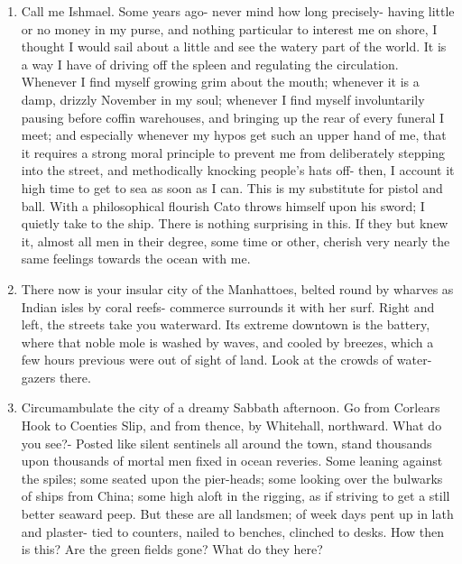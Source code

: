 \documentclass{../armymemo}
\begin{document}
\begin{enumerate}
	      \begin{enumerate}
		      \item Call me Ishmael. Some years ago- never mind how long precisely- having little or
		            no money in my purse, and nothing particular to interest me on shore, I thought
		            I would sail about a little and see the watery part of the world. It is a way I
		            have of driving off the spleen and regulating the circulation. Whenever I find
		            myself growing grim about the mouth; whenever it is a damp, drizzly November in
		            my soul; whenever I find myself involuntarily pausing before coffin warehouses,
		            and bringing up the rear of every funeral I meet; and especially whenever my
		            hypos get such an upper hand of me, that it requires a strong moral principle to
		            prevent me from deliberately stepping into the street, and methodically knocking
		            people's hats off- then, I account it high time to get to sea as soon as I can.
		            This is my substitute for pistol and ball. With a philosophical flourish Cato
		            throws himself upon his sword; I quietly take to the ship. There is nothing
		            surprising in this. If they but knew it, almost all men in their degree, some
		            time or other, cherish very nearly the same feelings towards the ocean with me.

		      \item There now is your insular city of the Manhattoes, belted round by wharves as
		            Indian isles by coral reefs- commerce surrounds it with her surf. Right and
		            left, the streets take you waterward. Its extreme downtown is the battery, where
		            that noble mole is washed by waves, and cooled by breezes, which a few hours
		            previous were out of sight of land. Look at the crowds of water-gazers there.

		      \item Circumambulate the city of a dreamy Sabbath afternoon. Go from Corlears Hook to
		            Coenties Slip, and from thence, by Whitehall, northward. What do you see?-
		            Posted like silent sentinels all around the town, stand thousands upon thousands
		            of mortal men fixed in ocean reveries. Some leaning against the spiles; some
		            seated upon the pier-heads; some looking over the bulwarks of ships from China;
		            some high aloft in the rigging, as if striving to get a still better seaward
		            peep. But these are all landsmen; of week days pent up in lath and plaster- tied
		            to counters, nailed to benches, clinched to desks. How then is this? Are the
		            green fields gone? What do they here?


\end{enumerate}
\end{enumerate}
\end{document}
